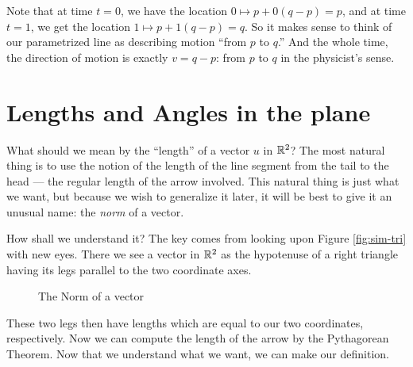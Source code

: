\documentclass[00-livre-main.tex]{subfiles}
\begin{document}
Note that at time $t=0$, we have the location $0 \mapsto p + 0(q-p) = p$, and at time $t=1$, we get the location $1 \mapsto p+1(q-p) = q$. So it makes sense to think of our parametrized line as describing motion ``from $p$ to $q$.'' And the whole time, the direction of motion is exactly $v=q-p$: from $p$ to $q$ in the physicist's sense.


\section*{Lengths and Angles in the plane}

What should we mean by the ``length'' of a vector $u$ in $\mathbb{R}^2$? The most natural thing is to use the notion of the length of the line segment from the tail to the head --- the regular length of the arrow involved. This natural thing is just what we want, but because we wish to generalize it later, it will be best to give it an unusual name: the \emph{norm} of a vector. 

How shall we understand it? The key comes from looking upon Figure \ref{fig:sim-tri}
with new eyes. There we see a vector in $\mathbb{R}^2$ as the hypotenuse of a right triangle 
having its legs parallel to the two coordinate axes.

\begin{figure}[h!]
\centering
{}
\caption{The Norm of a vector}
\label{fig:norm}
\end{figure}

These two legs then have lengths which are equal to our two coordinates, respectively.
Now we can compute the length of the arrow by the Pythagorean Theorem. Now that we understand what we want, we can make our definition.
\end{document}
